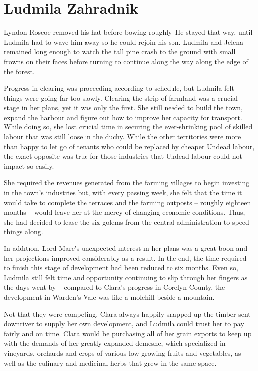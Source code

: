 \chapter{Ludmila Zahradnik}

Lyndon Roscoe removed his hat before bowing roughly. He stayed that way, until Ludmila had to wave him away so he could rejoin his son. Ludmila and Jelena remained long enough to watch the tall pine crash to the ground with small frowns on their faces before turning to continue along the way along the edge of the forest.

 

Progress in clearing was proceeding according to schedule, but Ludmila felt things were going far too slowly. Clearing the strip of farmland was a crucial stage in her plans, yet it was only the first. She still needed to build the town, expand the harbour and figure out how to improve her capacity for transport. While doing so, she lost crucial time in securing the ever-shrinking pool of skilled labour that was still loose in the duchy. While the other territories were more than happy to let go of tenants who could be replaced by cheaper Undead labour, the exact opposite was true for those industries that Undead labour could not impact so easily.

 

She required the revenues generated from the farming villages to begin investing in the town’s industries but, with every passing week, she felt that the time it would take to complete the terraces and the farming outposts – roughly eighteen months – would leave her at the mercy of changing economic conditions. Thus, she had decided to lease the six golems from the central administration to speed things along.

 

In addition, Lord Mare’s unexpected interest in her plans was a great boon and her projections improved considerably as a result. In the end, the time required to finish this stage of development had been reduced to six months. Even so, Ludmila still felt time and opportunity continuing to slip through her fingers as the days went by – compared to Clara’s progress in Corelyn County, the development in Warden’s Vale was like a molehill beside a mountain.

 

Not that they were competing. Clara always happily snapped up the timber sent downriver to supply her own development, and Ludmila could trust her to pay fairly and on time. Clara would be purchasing all of her grain exports to keep up with the demands of her greatly expanded demesne, which specialized in vineyards, orchards and crops of various low-growing fruits and vegetables, as well as the culinary and medicinal herbs that grew in the same space.

